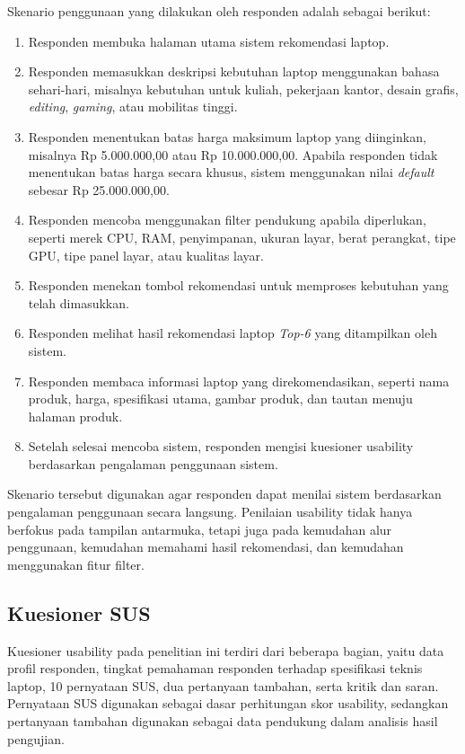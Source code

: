 Skenario penggunaan yang dilakukan oleh responden adalah sebagai berikut:
\begin{enumerate}
    \item Responden membuka halaman utama sistem rekomendasi laptop.
    \item Responden memasukkan deskripsi kebutuhan laptop menggunakan bahasa sehari-hari, misalnya kebutuhan untuk kuliah, pekerjaan kantor, desain grafis, \textit{editing}, \textit{gaming}, atau mobilitas tinggi.
    \item Responden menentukan batas harga maksimum laptop yang diinginkan, misalnya Rp 5.000.000,00 atau Rp 10.000.000,00. Apabila responden tidak menentukan batas harga secara khusus, sistem menggunakan nilai \textit{default} sebesar Rp 25.000.000,00.
    \item Responden mencoba menggunakan filter pendukung apabila diperlukan, seperti merek CPU, RAM, penyimpanan, ukuran layar, berat perangkat, tipe GPU, tipe panel layar, atau kualitas layar.
    \item Responden menekan tombol rekomendasi untuk memproses kebutuhan yang telah dimasukkan.
    \item Responden melihat hasil rekomendasi laptop \textit{Top-6} yang ditampilkan oleh sistem.
    \item Responden membaca informasi laptop yang direkomendasikan, seperti nama produk, harga, spesifikasi utama, gambar produk, dan tautan menuju halaman produk.
    \item Setelah selesai mencoba sistem, responden mengisi kuesioner usability berdasarkan pengalaman penggunaan sistem.
\end{enumerate}

Skenario tersebut digunakan agar responden dapat menilai sistem berdasarkan pengalaman penggunaan secara langsung. Penilaian usability tidak hanya berfokus pada tampilan antarmuka, tetapi juga pada kemudahan alur penggunaan, kemudahan memahami hasil rekomendasi, dan kemudahan menggunakan fitur filter.

\subsection{Kuesioner SUS}
Kuesioner usability pada penelitian ini terdiri dari beberapa bagian, yaitu data profil responden, tingkat pemahaman responden terhadap spesifikasi teknis laptop, 10 pernyataan SUS, dua pertanyaan tambahan, serta kritik dan saran. Pernyataan SUS digunakan sebagai dasar perhitungan skor usability, sedangkan pertanyaan tambahan digunakan sebagai data pendukung dalam analisis hasil pengujian.

